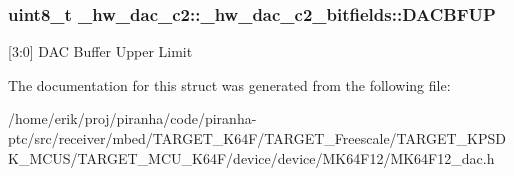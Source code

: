 \subsubsection[{\texorpdfstring{D\+A\+C\+B\+F\+UP}{DACBFUP}}]{\setlength{\rightskip}{0pt plus 5cm}uint8\+\_\+t \+\_\+hw\+\_\+dac\+\_\+c2\+::\+\_\+hw\+\_\+dac\+\_\+c2\+\_\+bitfields\+::\+D\+A\+C\+B\+F\+UP}\hypertarget{struct__hw__dac__c2_1_1__hw__dac__c2__bitfields_a2548ee5eaa1830ecbb94a5a5c3ebb3c1}{}\label{struct__hw__dac__c2_1_1__hw__dac__c2__bitfields_a2548ee5eaa1830ecbb94a5a5c3ebb3c1}
\mbox{[}3\+:0\mbox{]} D\+AC Buffer Upper Limit 

The documentation for this struct was generated from the following file\+:\begin{DoxyCompactItemize}
\item 
/home/erik/proj/piranha/code/piranha-\/ptc/src/receiver/mbed/\+T\+A\+R\+G\+E\+T\+\_\+\+K64\+F/\+T\+A\+R\+G\+E\+T\+\_\+\+Freescale/\+T\+A\+R\+G\+E\+T\+\_\+\+K\+P\+S\+D\+K\+\_\+\+M\+C\+U\+S/\+T\+A\+R\+G\+E\+T\+\_\+\+M\+C\+U\+\_\+\+K64\+F/device/device/\+M\+K64\+F12/M\+K64\+F12\+\_\+dac.\+h\end{DoxyCompactItemize}
